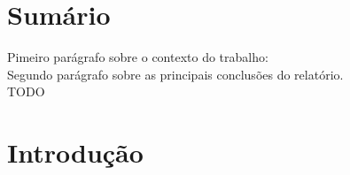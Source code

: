 \documentclass[a4paper, 11pt]{article}
\begin{document}
\maketitle
\thispagestyle{empty}


\newpage

%
%
%
%
%
%
%

\tableofcontents

\newpage

\section{Sumário}
\normalsize 

Pimeiro parágrafo sobre o contexto do trabalho:\\
Segundo parágrafo sobre as principais conclusões do relatório.\\
TODO

\section{Introdução}
\end{document}
